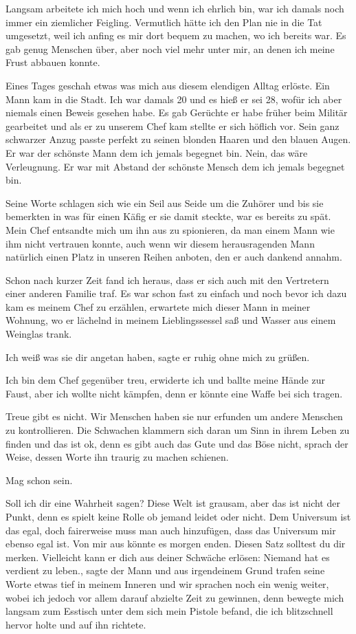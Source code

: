 \documentclass[11pt, a5paper]{article}
\newcommand{\nL}{Niemand hat es verdient zu leben.}
\begin{document}
\begin{spacing}{1.2}
		Langsam arbeitete ich mich hoch und wenn ich ehrlich bin, war ich damals noch immer ein ziemlicher Feigling. Vermutlich hätte ich den Plan nie in die Tat umgesetzt, weil ich anfing es mir dort bequem zu machen, wo ich bereits war. Es gab genug Menschen über, aber noch viel mehr unter mir, an denen ich meine Frust abbauen konnte.
		
		Eines Tages geschah etwas was mich aus diesem elendigen Alltag erlöste. Ein Mann kam in die Stadt. Ich war damals 20 und es hieß er sei 28, wofür ich aber niemals einen Beweis gesehen habe. Es gab Gerüchte er habe früher beim Militär gearbeitet und als er zu unserem Chef kam stellte er sich höflich vor. Sein ganz schwarzer Anzug passte perfekt zu seinen blonden Haaren und den blauen Augen. Er war der schönste Mann dem ich jemals begegnet bin. Nein, das wäre Verleugnung. Er war mit Abstand der schönste Mensch dem ich jemals begegnet bin.
		
		Seine Worte schlagen sich wie ein Seil aus Seide um die Zuhörer und bis sie bemerkten in was für einen Käfig er sie damit steckte, war es bereits zu spät. Mein Chef entsandte mich um ihn aus zu spionieren, da man einem Mann wie ihm nicht vertrauen konnte, auch wenn wir diesem herausragenden Mann natürlich einen Platz in unseren Reihen anboten, den er auch dankend annahm.
		
		Schon nach kurzer Zeit fand ich heraus, dass er sich auch mit den Vertretern einer anderen Familie traf. Es war schon fast zu einfach und noch bevor ich dazu kam es meinem Chef zu erzählen, erwartete mich dieser Mann in meiner Wohnung, wo er lächelnd in meinem Lieblingssessel saß und Wasser aus einem Weinglas trank.
		
		\frqq Ich weiß was sie dir angetan haben\flqq , sagte er ruhig ohne mich zu grüßen.
		
		\frqq Ich bin dem Chef gegenüber treu\flqq , erwiderte ich und ballte meine Hände zur Faust, aber ich wollte nicht kämpfen, denn er könnte eine Waffe bei sich tragen.
		
		\frqq Treue gibt es nicht. Wir Menschen haben sie nur erfunden um andere Menschen zu kontrollieren. Die Schwachen klammern sich daran um Sinn in ihrem Leben zu finden und das ist ok, denn es gibt auch das Gute und das Böse nicht\flqq , sprach der Weise, dessen Worte ihn traurig zu machen schienen.
		
		\frqq Mag schon sein.\flqq
		
		\frqq Soll ich dir eine Wahrheit sagen? Diese Welt ist grausam, aber das ist nicht der Punkt, denn es spielt keine Rolle ob jemand leidet oder nicht. Dem Universum ist das egal, doch fairerweise muss man auch hinzufügen, dass das Universum mir ebenso egal ist. Von mir aus könnte es morgen enden. Diesen Satz solltest du dir merken. Vielleicht kann er dich aus deiner Schwäche erlösen: \nL \flqq, sagte der Mann und aus irgendeinem Grund trafen seine Worte etwas tief in meinem Inneren und wir sprachen noch ein wenig weiter, wobei ich jedoch vor allem darauf abzielte Zeit zu gewinnen, denn bewegte mich langsam zum Esstisch unter dem sich mein Pistole befand, die ich blitzschnell hervor holte und auf ihn richtete.
		

\end{spacing}
\end{document}
